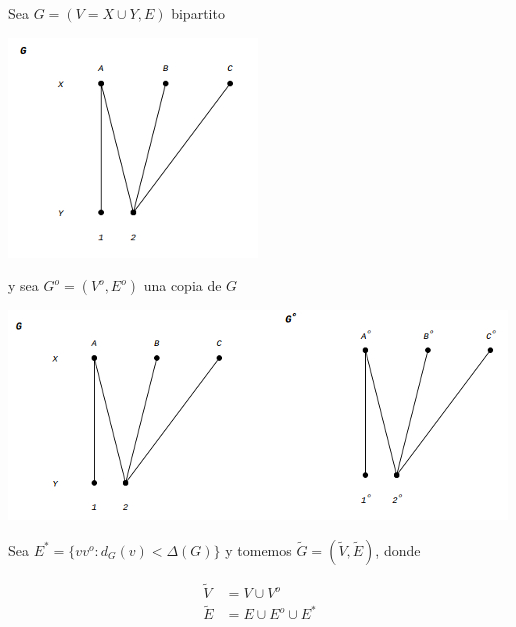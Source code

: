 \documentclass[10pt,a4paper]{article}
\begin{document}
Sea $G = (V=X \cup Y, E)$ bipartito

\begin{center}

    \begin{adjustbox}{max size={\textwidth}{\textheight}}
        \includegraphics{definitions/matching_13.jpg}
        \end{adjustbox}
    
\end{center}

y sea $G^o = (V^o, E^o)$ una copia de $G$

\begin{center}

    \begin{adjustbox}{max size={\textwidth}{\textheight}}
        \includegraphics{definitions/matching_14.jpg}
        \end{adjustbox}
    
\end{center}

Sea $E^* = \{vv^o: d_G(v) < \Delta (G)\}$ y tomemos $\tilde G = (\tilde V, \tilde E)$, donde

\begin{center}
\begin{align*} \tilde V &= V \cup V^o\\ \tilde E &= E \cup E^o \cup E^* \end{align*}
\end{center}
\end{document}
